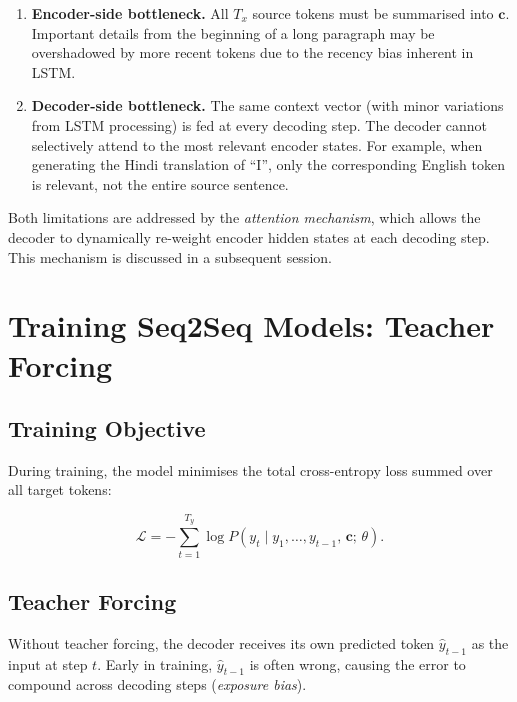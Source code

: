 \documentclass[12pt,a4paper]{article}
\begin{document}
\begin{enumerate}
  \item \textbf{Encoder-side bottleneck.}  All $T_x$ source tokens must be
        summarised into $\mathbf{c}$.  Important details from the beginning of
        a long paragraph may be overshadowed by more recent tokens due to the
        recency bias inherent in LSTM.
  \item \textbf{Decoder-side bottleneck.}  The same context vector (with minor
        variations from LSTM processing) is fed at every decoding step.  The
        decoder cannot selectively attend to the most relevant encoder states.
        For example, when generating the Hindi translation of ``I'', only the
        corresponding English token is relevant, not the entire source sentence.
\end{enumerate}

Both limitations are addressed by the \emph{attention mechanism}, which
allows the decoder to dynamically re-weight encoder hidden states at each
decoding step.  This mechanism is discussed in a subsequent session.

\section{Training Seq2Seq Models: Teacher Forcing}
\label{sec:teacher_forcing}

\subsection{Training Objective}
\label{subsec:training_obj}

During training, the model minimises the total cross-entropy loss summed over
all target tokens:

\begin{equation}
  \mathcal{L} = -\sum_{t=1}^{T_y} \log P(y_t \mid y_1, \ldots, y_{t-1},\,
                \mathbf{c};\,\theta).
  \label{eq:seq2seq_loss}
\end{equation}

\subsection{Teacher Forcing}
\label{subsec:teacher_forcing}

Without teacher forcing, the decoder receives its own predicted token
$\hat{y}_{t-1}$ as the input at step $t$.  Early in training, $\hat{y}_{t-1}$
is often wrong, causing the error to compound across decoding steps
(\emph{exposure bias}).
\end{document}
